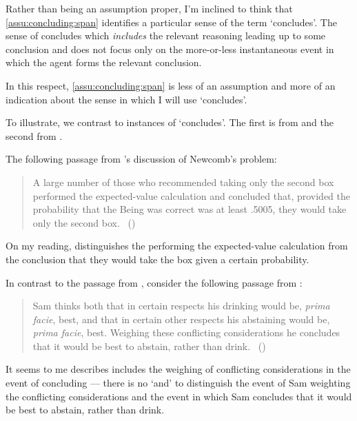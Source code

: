 \begin{note}
  Rather than being an assumption proper, I'm inclined to think that \autoref{assu:concluding:span} identifies a particular sense of the term `concludes'.
  The sense of concludes which \emph{includes} the relevant reasoning leading up to some conclusion and does not focus only on the more-or-less instantaneous event in which the agent forms the relevant conclusion.

  In this respect, \autoref{assu:concluding:span} is less of an assumption and more of an indication about the sense in which I will use `concludes'.
\end{note}

\begin{note}
  To illustrate, we contrast to instances of `concludes'.
  The first is from \textcite{Gardner:1986wp} and the second from \textcite{Bratman:1979aa}.

  The following passage from \citeauthor{Gardner:1986wp}'s discussion of Newcomb's problem:

  \begin{quote}
    A large number of those who recommended taking only the second box performed the expected-value calculation and concluded that, provided the probability that the Being was correct was at least .5005, they would take only the second box.%
    \mbox{ }\hfill\mbox{(\citeyear[166]{Gardner:1986wp})}
  \end{quote}

  On my reading, \citeauthor{Gardner:1986wp} distinguishes the performing the expected-value calculation from the conclusion that they would take the box given a certain probability.

  In contrast to the passage from \citeauthor{Gardner:1986wp}, consider the following passage from \citeyear{Bratman:1979aa}:

  \begin{quote}
    Sam thinks both that in certain respects his drinking would be, \emph{prima facie}, best, and that in certain other respects his abstaining would be, \emph{prima facie}, best.
    Weighing these conflicting considerations he concludes that it would be best to abstain, rather than drink.%
    \mbox{ }\hfill\mbox{(\citeyear[156]{Bratman:1979aa})}
  \end{quote}

  It seems to me \citeauthor{Bratman:1979aa} describes includes the weighing of conflicting considerations in the event of concluding --- there is no `and' to distinguish the event of Sam weighting the conflicting considerations and the event in which Sam concludes that it would be best to abstain, rather than drink.
\end{note}

